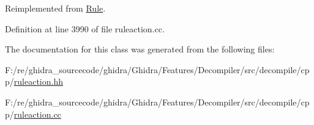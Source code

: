 Reimplemented from \mbox{\hyperlink{class_rule_a4023bfc7825de0ab866790551856d10e}{Rule}}.



Definition at line 3990 of file ruleaction.\+cc.



The documentation for this class was generated from the following files\+:\begin{DoxyCompactItemize}
\item 
F\+:/re/ghidra\+\_\+sourcecode/ghidra/\+Ghidra/\+Features/\+Decompiler/src/decompile/cpp/\mbox{\hyperlink{ruleaction_8hh}{ruleaction.\+hh}}\item 
F\+:/re/ghidra\+\_\+sourcecode/ghidra/\+Ghidra/\+Features/\+Decompiler/src/decompile/cpp/\mbox{\hyperlink{ruleaction_8cc}{ruleaction.\+cc}}\end{DoxyCompactItemize}
